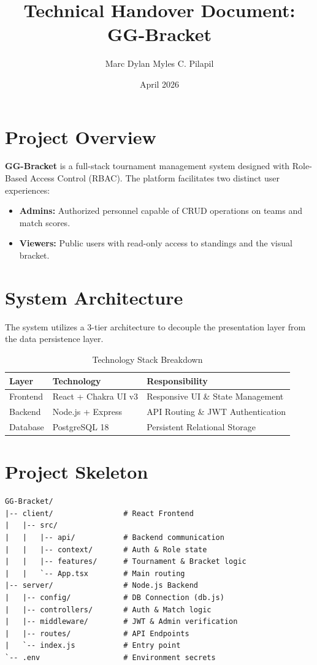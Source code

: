\documentclass[12pt]{article}
\title{Technical Handover Document: GG-Bracket}
\author{Marc Dylan Myles C. Pilapil}
\date{April 2026}
\begin{document}
\maketitle

\section{Project Overview}
\textbf{GG-Bracket} is a full-stack tournament management system designed with Role-Based Access Control (RBAC). The platform facilitates two distinct user experiences:
\begin{itemize}
    \item \textbf{Admins:} Authorized personnel capable of CRUD operations on teams and match scores.
    \item \textbf{Viewers:} Public users with read-only access to standings and the visual bracket.
\end{itemize}

\section{System Architecture}
The system utilizes a 3-tier architecture to decouple the presentation layer from the data persistence layer.

\begin{table}[h!]
\centering
\begin{tabular}{@{}lll@{}}
\toprule
\textbf{Layer} & \textbf{Technology} & \textbf{Responsibility} \\ \midrule
Frontend & React + Chakra UI v3 & Responsive UI \& State Management \\
Backend & Node.js + Express & API Routing \& JWT Authentication \\
Database & PostgreSQL 18 & Persistent Relational Storage \\ \bottomrule
\end{tabular}
\caption{Technology Stack Breakdown}
\end{table}

\newpage %
\begin{minipage}{\textwidth}
\section{Project Skeleton}
\begin{lstlisting}
GG-Bracket/
|-- client/                # React Frontend
|   |-- src/
|   |   |-- api/           # Backend communication
|   |   |-- context/       # Auth & Role state
|   |   |-- features/      # Tournament & Bracket logic
|   |   `-- App.tsx        # Main routing
|-- server/                # Node.js Backend
|   |-- config/            # DB Connection (db.js)
|   |-- controllers/       # Auth & Match logic
|   |-- middleware/        # JWT & Admin verification
|   |-- routes/            # API Endpoints
|   `-- index.js           # Entry point
`-- .env                   # Environment secrets
\end{lstlisting}
\end{minipage}
\end{document}
